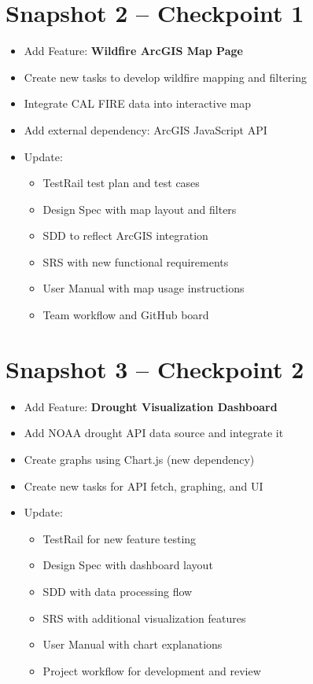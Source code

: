 \documentclass[12pt]{article}
\begin{document}
\section{Snapshot 2 – Checkpoint 1}
\begin{itemize}[leftmargin=*]
    \item Add Feature: \textbf{Wildfire ArcGIS Map Page}
    \item Create new tasks to develop wildfire mapping and filtering
    \item Integrate CAL FIRE data into interactive map
    \item Add external dependency: ArcGIS JavaScript API
    \item Update:
    \begin{itemize}
        \item TestRail test plan and test cases
        \item Design Spec with map layout and filters
        \item SDD to reflect ArcGIS integration
        \item SRS with new functional requirements
        \item User Manual with map usage instructions
        \item Team workflow and GitHub board
    \end{itemize}
\end{itemize}

\section{Snapshot 3 – Checkpoint 2}
\begin{itemize}[leftmargin=*]
    \item Add Feature: \textbf{Drought Visualization Dashboard}
    \item Add NOAA drought API data source and integrate it
    \item Create graphs using Chart.js (new dependency)
    \item Create new tasks for API fetch, graphing, and UI
    \item Update:
    \begin{itemize}
        \item TestRail for new feature testing
        \item Design Spec with dashboard layout
        \item SDD with data processing flow
        \item SRS with additional visualization features
        \item User Manual with chart explanations
        \item Project workflow for development and review
    \end{itemize}
\end{itemize}
\end{document}
